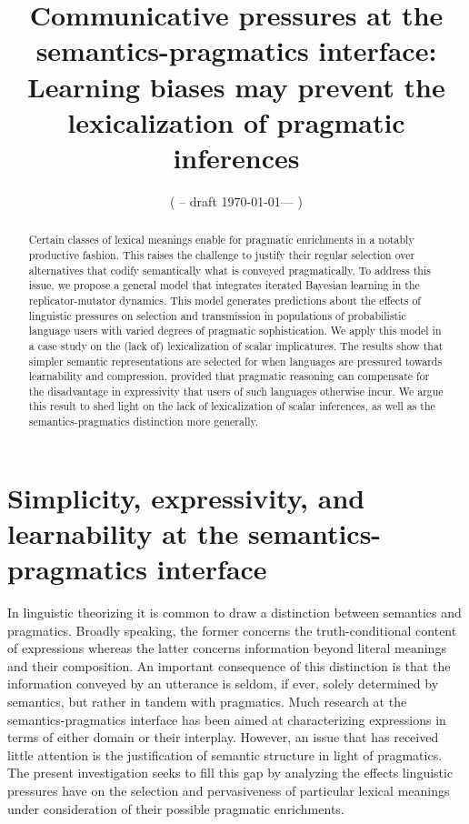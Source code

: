 \documentclass[a4paper]{article}
\title{Communicative pressures at the semantics-pragmatics interface:\\ Learning biases may prevent the lexicalization of pragmatic inferences}
\author{%
    ( -- draft \today --- )
}
\date{}
\begin{document}
\maketitle

\begin{abstract} Certain classes of lexical meanings enable for pragmatic enrichments in a notably productive fashion. This raises the challenge to justify their regular selection over alternatives that codify semantically what is conveyed pragmatically. To address this issue, we propose a general model that integrates iterated Bayesian learning in the replicator-mutator dynamics. This model generates predictions about the effects of linguistic pressures on selection and transmission in populations of probabilistic language users with varied degrees of pragmatic sophistication. We apply this model in a case study on the (lack of) lexicalization of scalar implicatures. The results show that simpler semantic representations are selected for when languages are pressured towards learnability and compression, provided that pragmatic reasoning can compensate for the disadvantage in expressivity that users of such languages otherwise incur. We argue this result to shed light on the lack of lexicalization of scalar inferences, as well as the semantics-pragmatics distinction more generally.
\end{abstract}

\section{Simplicity, expressivity, and learnability at the semantics-pragmatics interface}\label{sec:introduction}


In linguistic theorizing it is common to draw a distinction between semantics and pragmatics. Broadly speaking, the former concerns the truth-conditional content of expressions whereas the latter concerns information beyond literal meanings and their composition. An important consequence of this distinction is that the information conveyed by an utterance is seldom, if ever, solely determined by semantics, but rather in tandem with pragmatics. Much research at the semantics-pragmatics interface has been aimed at characterizing expressions in terms of either domain or their interplay. However, an issue that has received little attention is the justification of semantic structure in light of pragmatics. The present investigation seeks to fill this gap by analyzing the effects linguistic pressures have on the selection and pervasiveness of particular lexical meanings under consideration of their possible pragmatic enrichments.
\end{document}
